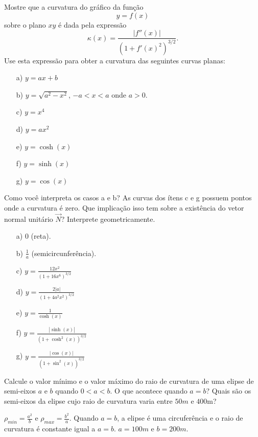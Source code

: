 \begin{exer} Mostre que a curvatura do gráfico da função
$$y=f(x)$$
sobre o plano $xy$
é dada pela expressão
$$\kappa(x)=\frac{|f''(x)|}{\left(1+f'(x)^2\right)^{3/2}}.$$
Use esta expressão para obter a curvatura das seguintes curvas planas:
\begin{itemize}
\item[a)] $y=ax+b$
\item[b)]$y=\sqrt{a^2-x^2}$, $-a<x<a$ onde $a>0$.
\item[c)] $y=x^4$
\item[d)] $y=ax^2$ 
\item[e)] $y=\cosh(x)$
\item[f)] $y=\sinh(x)$
\item[g)] $y=\cos(x)$
\end{itemize}
Como você interpreta os casos a e b? As curvas dos ítens c e g possuem pontos onde a curvatura é zero. Que implicação isso tem sobre a existência do vetor normal unitário $\vec{N}$? Interprete geometricamente.
\end{exer}
\begin{resp}
\begin{itemize}
\item[a)] $0$ (reta).
\item[b)]$\frac{1}{a}$ (semicircunferência).
\item[c)] $y=\frac{12x^2}{(1+16x^6)^{3/2}}$
\item[d)] $y=\frac{2|a|}{(1+4a^2x^2)^{3/2}}$
\item[e)] $y=\frac{1}{\cosh(x)}$
\item[f)] $y=\frac{|\sinh(x)|}{(1+\cosh^2(x))^{3/2}}$
\item[g)] $y=\frac{|\cos(x)|}{(1+\sin^2(x))^{3/2}}$
\end{itemize}
 \end{resp}

\begin{exer}
 Calcule o valor mínimo e o valor máximo do raio de curvatura de uma elipse de semi-eixos $a$ e $b$ quando $0<a<b$. O que acontece quando $a=b$? Quais são os semi-eixos da elipse cujo raio de curvatura varia entre $50m$ e $400$m?
\end{exer}
\begin{resp}
 $\rho_{min}= \frac{a^2}{b}$ e $\rho_{max}= \frac{b^2}{a}$. Quando $a=b$, a elipse é uma circuferência e o raio de curvatura é constante igual a $a=b$. $a=100m$ e $b=200m$. 
\end{resp}

